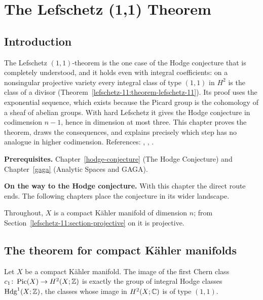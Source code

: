 \chapter{The Lefschetz (1,1) Theorem}\label{lefschetz-11}

\section{Introduction}\label{lefschetz-11:section-introduction}

The Lefschetz $(1,1)$-theorem is the one case of the Hodge conjecture that is completely understood, and it holds even with integral coefficients: on a
nonsingular projective variety every integral class of type $(1,1)$ in $H^2$ is the class of a divisor (Theorem~\ref{lefschetz-11:theorem-lefschetz-11}). Its proof
uses the exponential sequence, which exists because the Picard group is the cohomology of a sheaf of abelian groups. With hard Lefschetz it gives the Hodge conjecture
in codimension $n - 1$, hence in dimension at most three. This chapter proves the theorem, draws the consequences, and explains precisely which step has no analogue in
higher codimension. References: \cite[Chapter 1, Section 1]{griffiths-harris}, \cite[Section 11.3]{voisin-hodge-1}, \cite{kodaira-spencer-1953}.

\noindent\textbf{Prerequisites.} Chapter~\ref{hodge-conjecture} (The Hodge Conjecture) and Chapter~\ref{gaga} (Analytic Spaces and GAGA).

\noindent\textbf{On the way to the Hodge conjecture.} With this chapter the direct route ends. The following chapters place the conjecture in its wider landscape.

Throughout, $X$ is a compact K\"ahler manifold of dimension $n$; from Section~\ref{lefschetz-11:section-projective} on it is projective.

\section{The theorem for compact K\"ahler manifolds}\label{lefschetz-11:section-kahler}

\begin{theorem}\label{lefschetz-11:theorem-kahler}
Let $X$ be a compact K\"ahler manifold. The image of the first Chern class $c_1 \colon \operatorname{Pic}(X) \to H^2(X; \mathbb{Z})$ is exactly the group of integral Hodge classes
$\mathrm{Hdg}^1(X; \mathbb{Z})$, the classes whose image in $H^2(X; \mathbb{C})$ is of type $(1,1)$.
\end{theorem}

